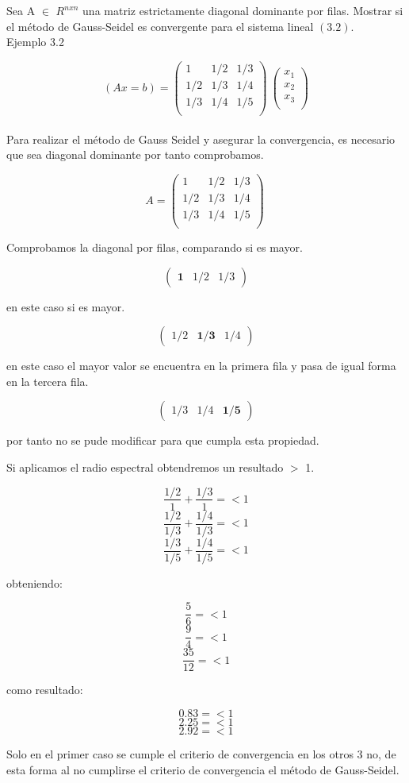 Sea A $\in$ $R^{nxn}$ una matriz estrictamente diagonal dominante por filas. Mostrar si el método de Gauss-Seidel es convergente para el sistema lineal $(3.2)$.
\\
Ejemplo 3.2 

$$(Ax = b) = \begin{pmatrix}
1 & 1/2 & 1/3 \\
1/2 & 1/3 & 1/4 \\
1/3 & 1/4 & 1/5 \\
\end{pmatrix}\
\begin{pmatrix}
x_{1} \\
x_{2} \\
x_{3} \\
\end{pmatrix}
$$
\\
Para realizar el método de Gauss Seidel y asegurar la convergencia, es necesario que sea diagonal dominante por tanto comprobamos.

$$
A = \begin{pmatrix}
1 & 1/2 & 1/3 \\
1/2 & 1/3 & 1/4 \\
1/3 & 1/4 & 1/5 \\
\end{pmatrix}\
$$

Comprobamos la diagonal por filas, comparando si es mayor.

$$\begin{pmatrix} \textbf{1} & 1/2 & 1/3
\end{pmatrix}$$

en este caso si es mayor.

$$\begin{pmatrix} 1/2 & \textbf{1/3} & 1/4
\end{pmatrix}$$

en este caso el mayor valor se encuentra en la primera fila y pasa de igual forma en la tercera fila.

$$\begin{pmatrix} 1/3 & 1/4 & \textbf{1/5}
\end{pmatrix}$$

por tanto no se pude modificar para que cumpla esta propiedad.

Si aplicamos el radio espectral obtendremos un resultado $>$ 1.

$$\frac{1/2}{1} + \frac{1/3}{1} =< 1$$
$$\frac{1/2}{1/3} + \frac{1/4}{1/3} =< 1$$
$$\frac{1/3}{1/5} + \frac{1/4}{1/5} =< 1$$

obteniendo:

$$\frac{5}{6} =< 1$$
$$\frac{9}{4} =< 1$$
$$\frac{35}{12} =< 1$$

como resultado:

$$0.83 =< 1$$
$$2.25 =< 1$$
$$2.92 =< 1$$

Solo en el primer caso se cumple el criterio de convergencia en los otros 3 no, de esta forma al no cumplirse el criterio de convergencia el método de Gauss-Seidel.